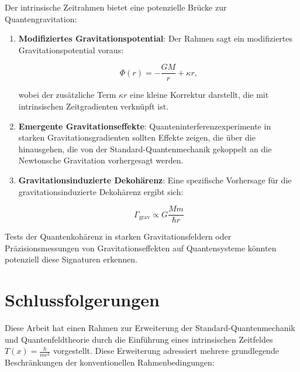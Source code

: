 \documentclass[12pt,a4paper]{article}
\newcommand{\Tfield}{T(x)}
\begin{document}
	Der intrinsische Zeitrahmen bietet eine potenzielle Brücke zur Quantengravitation:
	
	\begin{enumerate}
		\item \textbf{Modifiziertes Gravitationspotential}: Der Rahmen sagt ein modifiziertes Gravitationspotential voraus:
		
		\begin{equation}
			\Phi(r) = -\frac{G M}{r} + \kappa r,
			\label{eq:modified_potential}
		\end{equation}
		
		wobei der zusätzliche Term $\kappa r$ eine kleine Korrektur darstellt, die mit intrinsischen Zeitgradienten verknüpft ist.
		
		\item \textbf{Emergente Gravitationseffekte}: Quanteninterferenzexperimente in starken Gravitationsgradienten sollten Effekte zeigen, die über die hinausgehen, die von der Standard-Quantenmechanik gekoppelt an die Newtonsche Gravitation vorhergesagt werden.
		
		\item \textbf{Gravitationsinduzierte Dekohärenz}: Eine spezifische Vorhersage für die gravitationsinduzierte Dekohärenz ergibt sich:
		
		\begin{equation}
			\Gamma_{\text{grav}} \propto G \frac{M m}{\hbar r}
			\label{eq:grav_decoherence}
		\end{equation}
	\end{enumerate}
	
	Tests der Quantenkohärenz in starken Gravitationsfeldern oder Präzisionsmessungen von Gravitationseffekten auf Quantensysteme könnten potenziell diese Signaturen erkennen.
	
	\section{Schlussfolgerungen}
	\label{sec:conclusions}
	
	Diese Arbeit hat einen Rahmen zur Erweiterung der Standard-Quantenmechanik und Quantenfeldtheorie durch die Einführung eines intrinsischen Zeitfeldes $\Tfield = \frac{\hbar}{mc^2}$ vorgestellt. Diese Erweiterung adressiert mehrere grundlegende Beschränkungen der konventionellen Rahmenbedingungen:
	
\end{document}
